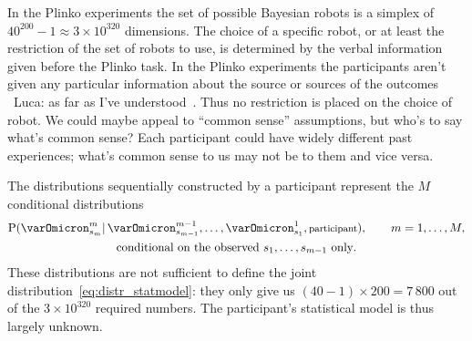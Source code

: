 \documentclass[\ifafour a4paper,12pt,\else a5paper,10pt,\fi%
onecolumn,oneside,article,%
british%
]{memoir}
\theoremstyle{remark}
\theoremstyle{innote}
\newcommand*{\citep}{\parencites}
\newcommand*{\p}{\mathrm{P}}%
\renewcommand*{\|}{\mathpunct{|}}
\newcommand*{\puzzle}{\maltese}
\newcommand{\mynote}[1]{ {\color{notecolour}\puzzle\ #1\ }}
\newcommand*{\yO}{\varOmicron}
\begin{document}
In the Plinko experiments \citep{filipowiczetal2014,filipowiczetal2016} the
set of possible Bayesian robots is a simplex of
$40^{200}-1 \approx 3\times10^{320}$ dimensions. The choice of a specific
robot, or at least the restriction of the set of robots to use, is
determined by the verbal information given before the Plinko task. In the
Plinko experiments the participants aren't given any particular information
about the source or sources of the outcomes \mynote{Luca: as far as I've
  understood}. Thus no restriction is placed on the choice of robot. We
could maybe appeal to \enquote{common sense} assumptions, but who's to say
what's common sense? Each participant could have widely different past
experiences; what's common sense to us may not be to them and vice versa.

The distributions sequentially constructed by a participant represent the
$M$ conditional distributions
\begin{multline}
  \p(\yO^m_{s_m} \| \yO^{m-1}_{s_{m-1}},\dotsc,\yO^1_{s_1},
  \text{\footnotesize participant}),
  \qquad m=1,\dotsc,M,\\
  \text{conditional on the observed $s_1,\dotsc,s_{m-1}$ only}.
\label{eq:cond_distribs}
\end{multline}
These distributions are not sufficient to define the joint
distribution~\eqref{eq:distr_statmodel}: they only give us
$(40-1)\times 200=7\,800$ out of the $3\times 10^{320}$ required numbers. The
participant's statistical model is thus largely unknown.
\end{document}
